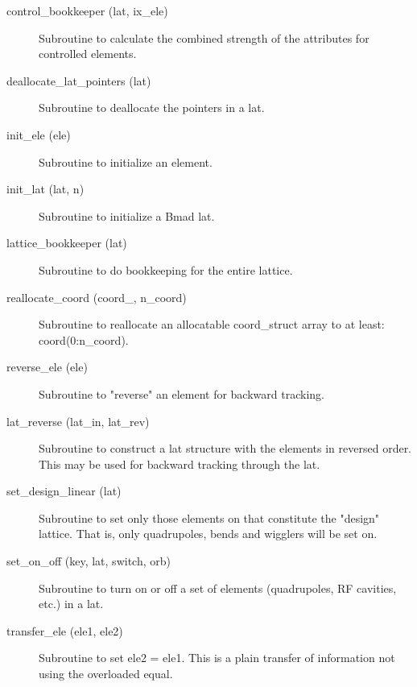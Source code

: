 \begin{description}

\item[control_bookkeeper (lat, ix_ele)] \Newline
Subroutine to calculate the combined strength of the attributes for
controlled elements.

\item[deallocate_lat_pointers (lat)] \Newline 
Subroutine to deallocate the pointers in a lat.

\item[init_ele (ele)] \Newline
Subroutine to initialize an element. 

\item[init_lat (lat, n)] \Newline 
Subroutine to initialize a Bmad lat.

\item[lattice_bookkeeper (lat)] \Newline 
Subroutine to do bookkeeping for the entire lattice.

\item[reallocate_coord (coord_, n_coord)] \Newline 
Subroutine to reallocate an allocatable  coord_struct array to at least:
coord(0:n_coord).

\item[reverse_ele (ele)] \Newline
Subroutine to "reverse" an element for backward tracking. 

\item[lat_reverse (lat_in, lat_rev)] \Newline
Subroutine to construct a lat structure with the elements in reversed 
order. This may be used for backward tracking through the lat. 

\item[set_design_linear (lat)] \Newline
Subroutine to set only those elements on that constitute the "design" 
lattice. That is, only quadrupoles, bends and wigglers will be set on. 

\item[set_on_off (key, lat, switch, orb)] \Newline
Subroutine to turn on or off a set of elements (quadrupoles,
RF cavities, etc.) in a lat.

\item[transfer_ele (ele1, ele2)] \Newline 
     Subroutine to set ele2 = ele1. 
     This is a plain transfer of information not using the overloaded equal.


\end{description}
